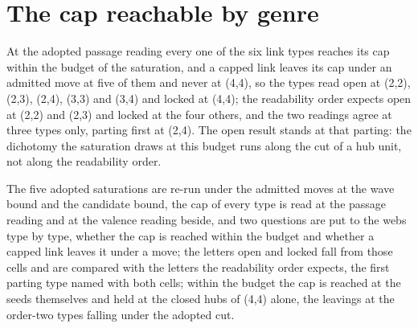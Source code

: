 \section{The cap reachable by genre}\label{mod:I-2-D534900-w-pgnc}
\begin{chwall}\label{box:I-2-D534900-w-pgnc:1}
At the adopted passage reading every one of the six link types reaches its cap within the budget of the saturation, and a capped link leaves its cap under an admitted move at five of them and never at (4,4), so the types read open at (2,2), (2,3), (2,4), (3,3) and (3,4) and locked at (4,4); the readability order expects open at (2,2) and (2,3) and locked at the four others, and the two readings agree at three types only, parting first at (2,4). The open result stands at that parting: the dichotomy the saturation draws at this budget runs along the cut of a hub unit, not along the readability order.
\end{chwall}
The five adopted saturations are re-run under the admitted moves at the wave bound and the candidate bound, the cap of every type is read at the passage reading and at the valence reading beside, and two questions are put to the webs type by type, whether the cap is reached within the budget and whether a capped link leaves it under a move; the letters open and locked fall from those cells and are compared with the letters the readability order expects, the first parting type named with both cells; within the budget the cap is reached at the seeds themselves and held at the closed hubs of (4,4) alone, the leavings at the order-two types falling under the adopted cut.

